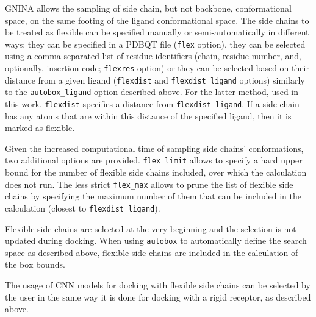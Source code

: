 \documentclass[journal=jcisd8,manuscript=article]{achemso}
\begin{document}
GNINA allows the sampling of side chain, but not backbone, conformational space, on the same footing of the ligand conformational space. The side chains to be treated as flexible can be specified manually or semi-automatically in different ways: they can be specified in a PDBQT file (\texttt{flex} option), they can be selected using a comma-separated list of residue identifiers (chain, residue number, and, optionally, insertion code; \texttt{flexres} option) or they can be selected based on their distance from a given ligand (\texttt{flexdist} and \texttt{flexdist\_ligand} options) similarly to the \texttt{autobox\_ligand} option described above. For the latter method, used in this work, \texttt{flexdist} specifies a distance from \texttt{flexdist\_ligand}. If a side chain has any atoms that are within this distance of the specified ligand, then it is marked as flexible. 

Given the increased computational time of sampling side chains' conformations, two additional options are provided. \texttt{flex\_limit} allows to specify a hard upper bound for the number of flexible side chains included, over which the calculation does not run. The less strict \texttt{flex\_max} allows to prune the list of flexible side chains by specifying the maximum number of them that can be included in the calculation (closest to \texttt{flexdist\_ligand}).

Flexible side chains are selected at the very beginning and the selection is not updated during docking. When using \texttt{autobox} to automatically define the search space as described above, flexible side chains are included in the calculation of the box bounds.

The usage of CNN models for docking with flexible side chains can be selected by the user in the same way it is done for docking with a rigid receptor, as described above.
\end{document}
